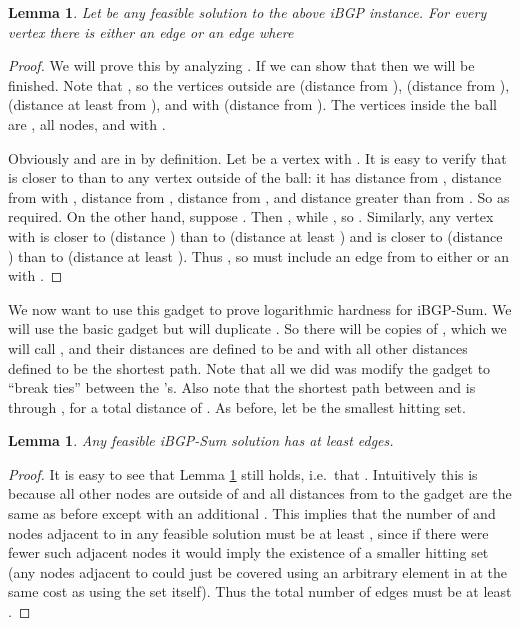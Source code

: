 \documentclass[11pt,letterpaper]{article}
\newtheorem{lemma}[theorem]{Lemma}
\theoremstyle{definition}
\newcounter{note}[section]
\begin{document}
\begin{lemma} \label{lem:gadget_necessary} Let  be any feasible
  solution to the above iBGP instance.  For every vertex 
  there is either an edge  or an edge  where 
\end{lemma}
\begin{proof}
  We will prove this by analyzing .  If we can show that
   then we
  will be finished.  Note that ,
  so the vertices outside  are  (distance
   from ),  (distance  from ),  (distance at least
   from ), and  with  (distance
   from ).  The vertices inside the ball are
  , all  nodes, and  with .

Obviously  and  are in  by definition.  Let
 be a vertex with .  It is easy to verify that 
is closer to  than to any vertex outside of the ball: it has
distance  from , distance 
from  with , distance  from ,
distance  from , and distance greater than  from .  So
 as required.  On the other hand, suppose .  Then , while , so
.  Similarly, any vertex  with  is closer to  (distance ) than to 
(distance at least ) and  is closer to  (distance ) than
to  (distance at least ).  Thus , so  must include an edge from
 to either  or an  with .
\end{proof}

We now want to use this gadget to prove logarithmic hardness for {\sc
  iBGP-Sum}.  We will use the basic gadget but will duplicate .  So there
will be  copies of , which we will call , and their distances are defined to be  and  with all
other distances defined to be the shortest path.  Note that all we did
was modify the gadget to ``break ties'' between the 's.  Also
note that the shortest path between  and  is through , for
a total distance of .  As before, let  be the
smallest hitting set.

\begin{lemma} \label{lem:ibgp-sum-necessary}
  Any feasible {\sc iBGP-Sum} solution has at least  edges.
\end{lemma}
\begin{proof}
  It is easy to see that Lemma \ref{lem:gadget_necessary} still holds,
  i.e.~that .  Intuitively this is because all other  nodes are outside
  of  and all distances from  to the gadget
  are the same as before except with an additional .  This
  implies that the number of  and  nodes adjacent to
   in any feasible solution must be at least , since if
  there were fewer such adjacent nodes it would imply the existence of
  a smaller hitting set (any  nodes adjacent to  could
  just be covered using an arbitrary element in  at the same cost
  as using the set itself).  Thus the total number of edges must be at
  least .
\end{proof}
\end{document}
